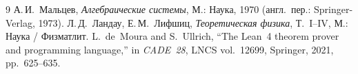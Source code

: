 \documentclass[11pt,a4paper]{article}
\theoremstyle{plain}
\theoremstyle{definition}
\begin{document}
\begin{thebibliography}{9}
А.\,И.~Мальцев, \emph{Алгебраические системы}, М.: Наука, 1970 (англ.\ пер.: Springer-Verlag, 1973).
Л.\,Д.~Ландау, Е.\,М.~Лифшиц, \emph{Теоретическая физика}, Т.~I--IV, М.: Наука / Физматлит.
L.~de~Moura and S.~Ullrich, ``The Lean~4 theorem prover and programming language,'' in \emph{CADE~28}, LNCS vol.~12699, Springer, 2021, pp.~625--635.
\end{thebibliography}
\end{document}
